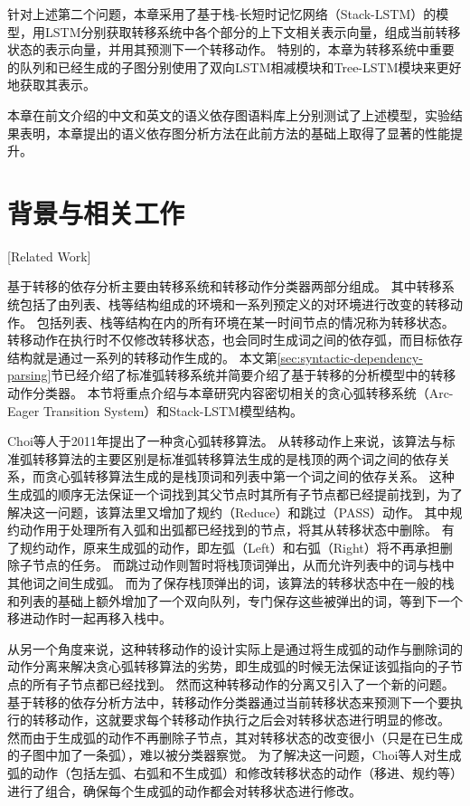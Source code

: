 针对上述第二个问题，本章采用了基于栈-长短时记忆网络（Stack-LSTM）的模型，用LSTM分别获取转移系统中各个部分的上下文相关表示向量，组成当前转移状态的表示向量，并用其预测下一个转移动作。
特别的，本章为转移系统中重要的队列和已经生成的子图分别使用了双向LSTM相减模块和Tree-LSTM模块来更好地获取其表示。

本章在前文介绍的中文和英文的语义依存图语料库上分别测试了上述模型，实验结果表明，本章提出的语义依存图分析方法在此前方法的基础上取得了显著的性能提升。

\section{背景与相关工作}[Related Work]

基于转移的依存分析主要由转移系统和转移动作分类器两部分组成。
其中转移系统包括了由列表、栈等结构组成的环境和一系列预定义的对环境进行改变的转移动作。
包括列表、栈等结构在内的所有环境在某一时间节点的情况称为转移状态。
转移动作在执行时不仅修改转移状态，也会同时生成词之间的依存弧，而目标依存结构就是通过一系列的转移动作生成的。
本文第\ref{sec:syntactic-dependency-parsing}节已经介绍了标准弧转移系统并简要介绍了基于转移的分析模型中的转移动作分类器。
本节将重点介绍与本章研究内容密切相关的贪心弧转移系统（Arc-Eager Transition System）\cite{choi-palmer-2011-getting,choi-mccallum-2013-transition}和Stack-LSTM模型结构\cite{dyer-etal-2015-transition}。

Choi等人\cite{choi-palmer-2011-getting}于2011年提出了一种贪心弧转移算法。
从转移动作上来说，该算法与标准弧转移算法的主要区别是标准弧转移算法生成的是栈顶的两个词之间的依存关系，而贪心弧转移算法生成的是栈顶词和列表中第一个词之间的依存关系。
这种生成弧的顺序无法保证一个词找到其父节点时其所有子节点都已经提前找到，为了解决这一问题，该算法里又增加了规约（Reduce）和跳过（PASS）动作。
其中规约动作用于处理所有入弧和出弧都已经找到的节点，将其从转移状态中删除。
有了规约动作，原来生成弧的动作，即左弧（Left）和右弧（Right）将不再承担删除子节点的任务。
而跳过动作则暂时将栈顶词弹出，从而允许列表中的词与栈中其他词之间生成弧。
而为了保存栈顶弹出的词，该算法的转移状态中在一般的栈和列表的基础上额外增加了一个双向队列，专门保存这些被弹出的词，等到下一个移进动作时一起再移入栈中。

从另一个角度来说，这种转移动作的设计实际上是通过将生成弧的动作与删除词的动作分离来解决贪心弧转移算法的劣势，即生成弧的时候无法保证该弧指向的子节点的所有子节点都已经找到。
然而这种转移动作的分离又引入了一个新的问题。
基于转移的依存分析方法中，转移动作分类器通过当前转移状态来预测下一个要执行的转移动作，这就要求每个转移动作执行之后会对转移状态进行明显的修改。
然而由于生成弧的动作不再删除子节点，其对转移状态的改变很小（只是在已生成的子图中加了一条弧），难以被分类器察觉。
为了解决这一问题，Choi等人对生成弧的动作（包括左弧、右弧和不生成弧）和修改转移状态的动作（移进、规约等）进行了组合，确保每个生成弧的动作都会对转移状态进行修改。

